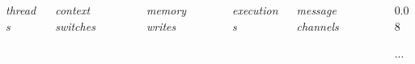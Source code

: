 \documentclass[aspectratio=169]{beamer}
\begin{document}
\begin{frame}
\begin{block}
      \begin{columns}
        \begin{column}{0.18\textwidth}
          \begin{center}
            \textit{\scriptsize threads}
          \end{center}
        \end{column}
        \begin{column}{0.18\textwidth}
          \begin{center}
            \textit{\scriptsize context switches}
          \end{center}
        \end{column}
        \begin{column}{0.18\textwidth}
          \begin{center}
            \textit{\scriptsize memory writes}
          \end{center}
        \end{column}
        \begin{column}{0.18\textwidth}
          \begin{center}
            \textit{\scriptsize executions}
          \end{center}
        \end{column}
        \begin{column}{0.18\textwidth}
          \begin{center}
            \textit{\scriptsize message channels}
          \end{center}
        \end{column}
        \begin{column} {0.08\textwidth}
          \begin{center}
            ...
         \end{center}
        \end{column}
      \end{columns}
    \end{block}
\end{frame}
\end{document}
